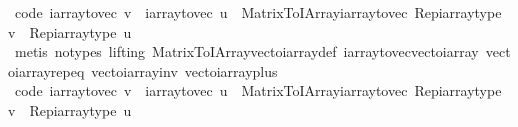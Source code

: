 \begin{isabellebody}
\endisatagproof
{\isafoldproof}%
%
\isadelimproof
\isanewline
%
\endisadelimproof
\isanewline
{}\isamarkupfalse%
\ {\isacharbrackleft}{\kern0pt}code{\isacharbrackright}{\kern0pt}{\isacharcolon}{\kern0pt}\ {\isachardoublequoteopen}iarray{\isacharunderscore}{\kern0pt}to{\isacharunderscore}{\kern0pt}vec\ v\ {\isacharplus}{\kern0pt}\ iarray{\isacharunderscore}{\kern0pt}to{\isacharunderscore}{\kern0pt}vec\ u\ {\isacharequal}{\kern0pt}\ {\isacharparenleft}{\kern0pt}Matrix{\isacharunderscore}{\kern0pt}To{\isacharunderscore}{\kern0pt}IArray{\isachardot}{\kern0pt}iarray{\isacharunderscore}{\kern0pt}to{\isacharunderscore}{\kern0pt}vec\ {\isacharparenleft}{\kern0pt}Rep{\isacharunderscore}{\kern0pt}iarray{\isacharunderscore}{\kern0pt}type\ v\ {\isacharplus}{\kern0pt}\ Rep{\isacharunderscore}{\kern0pt}iarray{\isacharunderscore}{\kern0pt}type\ u{\isacharparenright}{\kern0pt}{\isacharparenright}{\kern0pt}{\isachardoublequoteclose}\isanewline
%
\isadelimproof
\ \ %
\endisadelimproof
%
\isatagproof
{}\isamarkupfalse%
\ {\isacharparenleft}{\kern0pt}metis\ {\isacharparenleft}{\kern0pt}no{\isacharunderscore}{\kern0pt}types{\isacharcomma}{\kern0pt}\ lifting{\isacharparenright}{\kern0pt}\ Matrix{\isacharunderscore}{\kern0pt}To{\isacharunderscore}{\kern0pt}IArray{\isachardot}{\kern0pt}vec{\isacharunderscore}{\kern0pt}to{\isacharunderscore}{\kern0pt}iarray{\isacharunderscore}{\kern0pt}def\ iarray{\isacharunderscore}{\kern0pt}to{\isacharunderscore}{\kern0pt}vec{\isacharunderscore}{\kern0pt}vec{\isacharunderscore}{\kern0pt}to{\isacharunderscore}{\kern0pt}iarray\ vec{\isacharunderscore}{\kern0pt}to{\isacharunderscore}{\kern0pt}iarray{\isachardot}{\kern0pt}rep{\isacharunderscore}{\kern0pt}eq\ vec{\isacharunderscore}{\kern0pt}to{\isacharunderscore}{\kern0pt}iarray{\isacharunderscore}{\kern0pt}inv\ vec{\isacharunderscore}{\kern0pt}to{\isacharunderscore}{\kern0pt}iarray{\isacharunderscore}{\kern0pt}plus{\isacharparenright}{\kern0pt}%
\endisatagproof
{\isafoldproof}%
%
\isadelimproof
\isanewline
%
\endisadelimproof
\isanewline
{}\isamarkupfalse%
\ {\isacharbrackleft}{\kern0pt}code{\isacharbrackright}{\kern0pt}{\isacharcolon}{\kern0pt}\ {\isachardoublequoteopen}iarray{\isacharunderscore}{\kern0pt}to{\isacharunderscore}{\kern0pt}vec\ v\ {\isacharminus}{\kern0pt}\ iarray{\isacharunderscore}{\kern0pt}to{\isacharunderscore}{\kern0pt}vec\ u\ {\isacharequal}{\kern0pt}\ {\isacharparenleft}{\kern0pt}Matrix{\isacharunderscore}{\kern0pt}To{\isacharunderscore}{\kern0pt}IArray{\isachardot}{\kern0pt}iarray{\isacharunderscore}{\kern0pt}to{\isacharunderscore}{\kern0pt}vec\ {\isacharparenleft}{\kern0pt}Rep{\isacharunderscore}{\kern0pt}iarray{\isacharunderscore}{\kern0pt}type\ v\ {\isacharminus}{\kern0pt}\ Rep{\isacharunderscore}{\kern0pt}iarray{\isacharunderscore}{\kern0pt}type\ u{\isacharparenright}{\kern0pt}{\isacharparenright}{\kern0pt}{\isachardoublequoteclose}\isanewline

\end{isabellebody}
